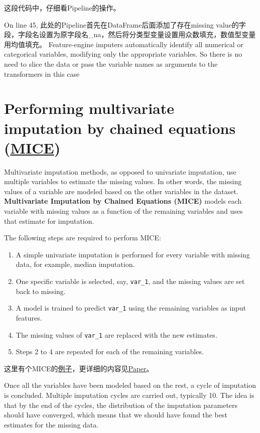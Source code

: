 这段代码中，仔细看Pipeline的操作。

On line 45, 此处的Pipeline首先在DataFrame后面添加了存在missing value的字段，字段名设置为原字段名\_na，然后将分类型变量设置用众数填充，数值型变量用均值填充。 Feature-engine imputers automatically identify all numerical or categorical variables, 
modifying only the appropriate variables. So there is no need to slice the data or pass the 
variable names as arguments to the transformers in this case

\section{Performing multivariate imputation by chained equations (\href{https://cran.r-project.org/web/packages/miceRanger/vignettes/miceAlgorithm.html}{MICE})}
Multivariate imputation methods, as opposed to univariate imputation, use multiple variables to estimate the missing values. In other words, the missing values of a variable are modeled based on the other variables in the dataset. \textbf{Multivariate Imputation by Chained Equations (MICE)} models each variable with missing values as a function of the remaining variables and uses that estimate for imputation.

The following steps are required to perform MICE:
\begin{enumerate}
    \item A simple univariate imputation is performed for every variable with missing data, for example, median imputation.
    \item One specific variable is selected, say, \verb|var_1|, and the missing values are set back to missing.
    \item A model is trained to predict \verb|var_1| using the remaining variables as input features.
    \item The missing values of \verb|var_1| are replaced with the new estimates.
    \item Steps 2 to 4 are repeated for each of the remaining variables.
\end{enumerate}

这里有个MICE的\href{https://www.numpyninja.com/post/mice-algorithm-to-impute-missing-values-in-a-dataset}{例子}，更详细的内容见\href{https://www.jstatsoft.org/article/view/v045i03}{Paper}。

Once all the variables have been modeled based on the rest, a cycle of imputation is concluded. Multiple imputation cycles are carried out, typically 10. The idea is that by the end of the cycles, the distribution of the imputation parameters should have converged, which means that we should have found the best estimates for the missing data.

